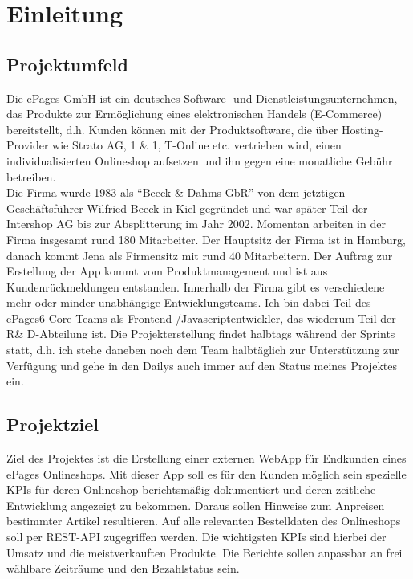 \section{Einleitung}
\label{sec:Einleitung}


\subsection{Projektumfeld} 
\label{sec:Projektumfeld}
Die ePages GmbH ist ein deutsches Software- und Dienstleistungsunternehmen, das Produkte zur Ermöglichung eines elektronischen Handels (E-Commerce) bereitstellt, d.h. Kunden können mit der Produktsoftware, die über Hosting-Provider wie Strato AG, 1 \& 1, T-Online etc. vertrieben wird, einen individualisierten Onlineshop aufsetzen und ihn gegen eine monatliche Gebühr betreiben.\\
Die Firma wurde 1983 als ``Beeck \& Dahms GbR'' von dem jetztigen Geschäftsführer Wilfried Beeck in Kiel gegründet und war später Teil der Intershop AG bis zur Absplitterung im Jahr 2002. Momentan arbeiten in der Firma insgesamt rund 180 Mitarbeiter. Der Hauptsitz der Firma ist in Hamburg, danach kommt Jena als Firmensitz mit rund 40 Mitarbeitern. Der Auftrag zur Erstellung der App kommt vom Produktmanagement und ist aus Kundenrückmeldungen entstanden. Innerhalb der Firma gibt es verschiedene mehr oder minder unabhängige Entwicklungsteams. Ich bin dabei Teil des ePages6-Core-Teams als Frontend-/Javascriptentwickler, das wiederum Teil der R\& D-Abteilung ist. Die Projekterstellung findet halbtags während der Sprints statt, d.h. ich stehe daneben noch dem Team halbtäglich zur Unterstützung zur Verfügung und gehe in den Dailys auch immer auf den Status meines Projektes ein. 

\subsection{Projektziel} 
\label{sec:Projektziel}

Ziel des Projektes ist die Erstellung einer externen WebApp für Endkunden eines ePages Onlineshops. Mit dieser App soll es für den Kunden möglich sein spezielle KPIs für deren Onlineshop berichtsmäßig dokumentiert und deren zeitliche Entwicklung angezeigt zu bekommen. Daraus sollen Hinweise zum Anpreisen bestimmter Artikel resultieren. Auf alle relevanten Bestelldaten des Onlineshops soll per REST-API zugegriffen werden. Die wichtigsten KPIs sind hierbei der Umsatz und die meistverkauften Produkte. Die Berichte sollen anpassbar an frei wählbare Zeiträume und den Bezahlstatus sein.



